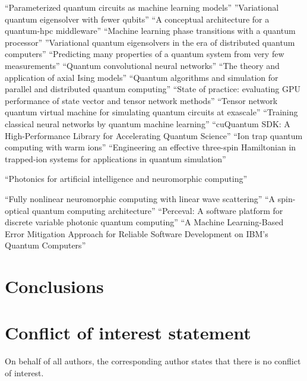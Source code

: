 \documentclass[]{article}
\begin{document}
\cite{Benedetti_2019}
``Parameterized quantum circuits as machine learning models''
\cite{PhysRevResearch.1.023025}
''Variational quantum eigensolver with fewer qubits''
\cite{saurabh2023conceptual}
``A conceptual architecture for a quantum-hpc middleware''
\cite{uvarov2020machine}
``Machine learning phase transitions with a quantum processor''
\cite{khait2023variational}
''Variational quantum eigensolvers in the era of distributed quantum computers''
\cite{huang2020predicting}
``Predicting many properties of a quantum system from very few measurements''
\cite{cong2019quantum}
``Quantum convolutional neural networks''
\cite{yeomans1988theory}
``The theory and application of axial Ising models''
\cite{parekh2021quantum}
``Quantum algorithms and simulation for parallel and distributed quantum computing''
\cite{vallero2024state}
``State of practice: evaluating GPU performance of state vector and tensor network methods''
\cite{nguyen2022tensor}
``Tensor network quantum virtual machine for simulating quantum circuits at exascale''
\cite{liu2024training}
``Training classical neural networks by quantum machine learning''
\cite{10313722}
``cuQuantum SDK: A High-Performance Library for Accelerating Quantum Science''
\cite{milburn2000ion}
``Ion trap quantum computing with warm ions''
\cite{Andrade_2022}
``Engineering an effective three-spin Hamiltonian in trapped-ion systems for applications in quantum simulation''

\cite{shastri2021photonics}
``Photonics for artificial intelligence and neuromorphic computing''

\cite{wanjura2024fully}
``Fully nonlinear neuromorphic computing with linear wave scattering''
\cite{de2024spin}
``A spin-optical quantum computing architecture''
\cite{heurtel2023perceval}
``Perceval: A software platform for discrete variable photonic quantum computing''
\cite{muqeet2024machine}
``A Machine Learning-Based Error Mitigation Approach for Reliable Software Development on IBM’s Quantum Computers''


\section{Conclusions}


\section{Conflict of interest statement }

On behalf of all authors, the corresponding author states that there is no conflict of interest.


\end{document}
